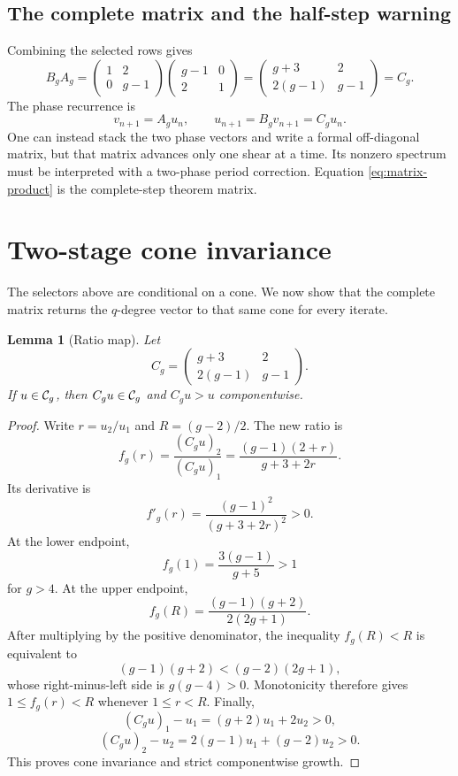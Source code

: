 \documentclass[11pt]{article}
\newtheorem{lemma}[theorem]{Lemma}
\theoremstyle{remark}
\numberwithin{equation}{section}
\begin{document}
\subsection{The complete matrix and the half-step warning}

Combining the selected rows gives
\begin{equation}\label{eq:matrix-product}
 B_gA_g
 =
 \begin{pmatrix}1&2\\0&g-1\end{pmatrix}
 \begin{pmatrix}g-1&0\\2&1\end{pmatrix}
 =
 \begin{pmatrix}g+3&2\\2(g-1)&g-1\end{pmatrix}
 =C_g.
\end{equation}
The phase recurrence is
\begin{equation}\label{eq:phase}
 v_{n+1}=A_gu_n,\qquad
 u_{n+1}=B_gv_{n+1}=C_gu_n.
\end{equation}
One can instead stack the two phase vectors and write a formal off-diagonal
matrix, but that matrix advances only one shear at a time.  Its nonzero
spectrum must be interpreted with a two-phase period correction.  Equation
\eqref{eq:matrix-product} is the complete-step theorem matrix.

\section{Two-stage cone invariance}\label{sec:cone}

The selectors above are conditional on a cone.  We now show that the complete
matrix returns the \(q\)-degree vector to that same cone for every iterate.

\begin{lemma}[Ratio map]\label{lem:cone}
Let
\[
 C_g=\begin{pmatrix}g+3&2\\2(g-1)&g-1\end{pmatrix}.
\]
If \(u\in\mathcal{C}_g\), then \(C_gu\in\mathcal{C}_g\) and \(C_gu>u\) componentwise.
\end{lemma}

\begin{proof}
Write \(r=u_2/u_1\) and \(R=(g-2)/2\).  The new ratio is
\[
 f_g(r)=\frac{(C_gu)_2}{(C_gu)_1}
 =\frac{(g-1)(2+r)}{g+3+2r}.
\]
Its derivative is
\[
 f'_g(r)=\frac{(g-1)^2}{(g+3+2r)^2}>0.
\]
At the lower endpoint,
\[
 f_g(1)=\frac{3(g-1)}{g+5}>1
\]
for \(g>4\).  At the upper endpoint,
\[
 f_g(R)=
 \frac{(g-1)(g+2)}{2(2g+1)}.
\]
After multiplying by the positive denominator, the inequality \(f_g(R)<R\)
is equivalent to
\[
 (g-1)(g+2)<(g-2)(2g+1),
\]
whose right-minus-left side is \(g(g-4)>0\).  Monotonicity therefore gives
\(1\leq f_g(r)<R\) whenever \(1\leq r<R\).  Finally,
\[
 (C_gu)_1-u_1=(g+2)u_1+2u_2>0,
\]
\[
 (C_gu)_2-u_2=2(g-1)u_1+(g-2)u_2>0.
\]
This proves cone invariance and strict componentwise growth.
\end{proof}
\end{document}
